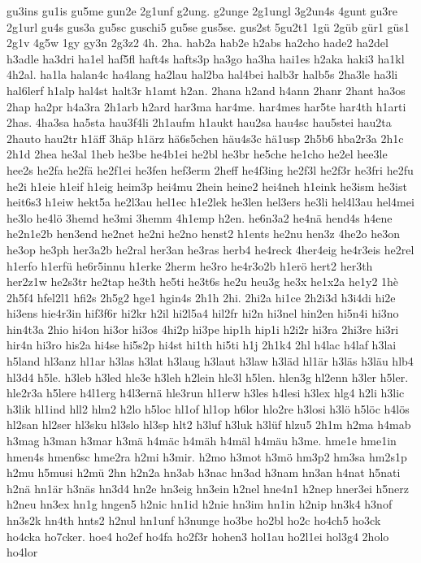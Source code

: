 {gu3ins
gu1is
gu5me
gun2e
2g1unf
g2ung.
g2unge
2g1ungl
3g2un4s
4gunt
gu3re
2g1url
gu4s
gus3a
gu5sc
guschi5
gu5se
gus5se.
gus2st
5gu2t1
1gü
2güb
gür1
güs1
2g1v
4g5w
1gy
gy3n
2g3z2
4h.
2ha.
hab2a
hab2e
h2abs
ha2cho
hade2
ha2del
h3adle
ha3dri
ha1el
haf5fl
haft4s
hafts3p
ha3go
ha3ha
hai1es
h2aka
haki3
ha1kl
4h2al.
ha1la
halan4c
ha4lang
ha2lau
hal2ba
hal4bei
halb3r
halb5s
2ha3le
ha3li
hal6lerf
h1alp
hal4st
halt3r
h1amt
h2an.
2hana
h2and
h4ann
2hanr
2hant
ha3os
2hap
ha2pr
h4a3ra
2h1arb
h2ard
har3ma
har4me.
har4mes
har5te
har4th
h1arti
2has.
4ha3sa
ha5sta
hau3f4li
2h1aufm
h1aukt
hau2sa
hau4sc
hau5stei
hau2ta
2hauto
hau2tr
h1äff
3häp
h1ärz
hä6s5chen
häu4s3c
hä1usp
2h5b6
hba2r3a
2h1c
2h1d
2hea
he3al
1heb
he3be
he4b1ei
he2bl
he3br
he5che
he1cho
he2el
hee3le
hee2s
he2fa
he2fä
he2f1ei
he3fen
hef3erm
2heff
he4f3ing
he2f3l
he2f3r
he3fri
he2fu
he2i
h1eie
h1eif
h1eig
heim3p
hei4mu
2hein
heine2
hei4neh
h1eink
he3ism
he3ist
heit6s3
h1eiw
hekt5a
he2l3au
hel1ec
h1e2lek
he3len
hel3ers
he3li
hel4l3au
hel4mei
he3lo
he4lö
3hemd
he3mi
3hemm
4h1emp
h2en.
he6n3a2
he4nä
hend4s
h4ene
he2n1e2b
hen3end
he2net
he2ni
he2no
henst2
h1ents
he2nu
hen3z
4he2o
he3on
he3op
he3ph
her3a2b
he2ral
her3an
he3ras
herb4
he4reck
4her4eig
he4r3eis
he2rel
h1erfo
h1erfü
he6r5innu
h1erke
2herm
he3ro
he4r3o2b
h1erö
hert2
her3th
her2z1w
he2s3tr
he2tap
he3th
he5ti
he3t6s
he2u
heu3g
he3x
he1x2a
he1y2
1hè
2h5f4
hfel2l1
hfi2s
2h5g2
hge1
hgin4s
2h1h
2hi.
2hi2a
hi1ce
2h2i3d
h3i4di
hi2e
hi3ens
hie4r3in
hif3f6r
hi2kr
h2il
hi2l5a4
hil2fr
hi2n
hi3nel
hin2en
hi5n4i
hi3no
hin4t3a
2hio
hi4on
hi3or
hi3os
4hi2p
hi3pe
hip1h
hip1i
h2i2r
hi3ra
2hi3re
hi3ri
hir4n
hi3ro
his2a
hi4se
hi5s2p
hi4st
hi1th
hi5ti
h1j
2h1k4
2hl
h4lac
h4laf
h3lai
h5land
hl3anz
hl1ar
h3las
h3lat
h3laug
h3laut
h3law
h3läd
hl1är
h3läs
h3läu
hlb4
hl3d4
h5le.
h3leb
h3led
hle3e
h3leh
h2lein
hle3l
h5len.
hlen3g
hl2enn
h3ler
h5ler.
hle2r3a
h5lere
h4l1erg
h4l3ernä
hle3run
hl1erw
h3les
h4lesi
h3lex
hlg4
h2li
h3lic
h3lik
hl1ind
hll2
hlm2
h2lo
h5loc
hl1of
hl1op
h6lor
hlo2re
h3losi
h3lö
h5löc
h4lös
hl2san
hl2ser
hl3sku
hl3slo
hl3sp
hlt2
h3luf
h3luk
h3lüf
hlzu5
2h1m
h2ma
h4mab
h3mag
h3man
h3mar
h3mä
h4mäc
h4mäh
h4mäl
h4mäu
h3me.
hme1e
hme1in
hmen4s
hmen6sc
hme2ra
h2mi
h3mir.
h2mo
h3mot
h3mö
hm3p2
hm3sa
hm2s1p
h2mu
h5musi
h2mü
2hn
h2n2a
hn3ab
h3nac
hn3ad
h3nam
hn3an
h4nat
h5nati
h2nä
hn1är
h3näs
hn3d4
hn2e
hn3eig
hn3ein
h2nel
hne4n1
h2nep
hner3ei
h5nerz
h2neu
hn3ex
hn1g
hngen5
h2nic
hn1id
h2nie
hn3im
hn1in
h2nip
hn3k4
h3nof
hn3s2k
hn4th
hnts2
h2nul
hn1unf
h3nunge
ho3be
ho2bl
ho2c
ho4ch5
ho3ck
ho4cka
ho7cker.
hoe4
ho2ef
ho4fa
ho2f3r
hohen3
hol1au
ho2l1ei
hol3g4
2holo
ho4lor
}
